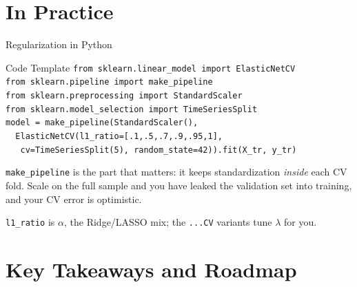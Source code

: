 \documentclass[aspectratio=169, 11pt]{beamer}
\begin{document}
\section{In Practice}


\begin{frame}{Regularization in Python}
  \begin{examplebox}{Code Template}
    {\scriptsize
    \texttt{from sklearn.linear\_model import ElasticNetCV}\\
    \texttt{from sklearn.pipeline import make\_pipeline}\\
    \texttt{from sklearn.preprocessing import StandardScaler}\\
    \texttt{from sklearn.model\_selection import TimeSeriesSplit}\\[2pt]
    \texttt{model = make\_pipeline(StandardScaler(),}\\
    \texttt{\ \ ElasticNetCV(l1\_ratio=[.1,.5,.7,.9,.95,1],}\\
    \texttt{\ \ \ cv=TimeSeriesSplit(5), random\_state=42)).fit(X\_tr, y\_tr)}
    }
  \end{examplebox}
  \texttt{make\_pipeline} is the part that matters: it keeps standardization \emph{inside}
  each CV fold. Scale on the full sample and you have leaked the validation set into
  training, and your CV error is optimistic.

  \texttt{l1\_ratio} is $\alpha$, the Ridge/LASSO mix; the \texttt{...CV} variants tune
  $\lambda$ for you.

\end{frame}

\section{Key Takeaways and Roadmap}

\end{document}
